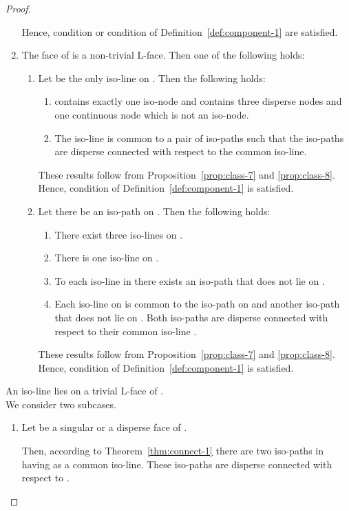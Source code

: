 \documentclass[a4paper,11pt]{article}
\begin{document}
\begin{proof}
\begin{enumerate}
Hence, condition  or condition  of Definition~\ref{def:component-1} are satisfied.
\item The face  of  is a non-trivial L-face. Then one of the following holds:
\begin{enumerate}
\item Let  be the only iso-line on . Then the following holds:
\begin{enumerate}
\item  contains exactly one iso-node and  contains three disperse nodes and one continuous node
which is not an iso-node.
\item The iso-line  is common to a pair of iso-paths such that the iso-paths are disperse
connected with respect to the common iso-line.
\end{enumerate}
These results follow from Proposition~\ref{prop:class-7} and \ref{prop:class-8}. Hence, condition  of
Definition~\ref{def:component-1} is satisfied.
\item Let there be an iso-path on . Then the following holds:
\begin{enumerate}
\item There exist three iso-lines on .
\item There is one iso-line on .
\item To each iso-line in  there exists an iso-path that does not lie on .
\item Each iso-line on  is common to the iso-path on  and another iso-path that does not lie on
. Both iso-paths are disperse connected with respect to their common iso-line .
\end{enumerate}
These results follow from Proposition~\ref{prop:class-7} and \ref{prop:class-8}. Hence, condition  of
Definition~\ref{def:component-1} is satisfied.
\end{enumerate}
\end{enumerate}
An iso-line  lies on a trivial L-face
 of . \\

We consider two subcases.
\begin{enumerate}
\item Let  be a singular or a disperse face of .

Then, according to Theorem~\ref{thm:connect-1} there are two iso-paths in  having  as a common
iso-line. These iso-paths are disperse connected with respect to .


\end{enumerate}
\end{proof}
\end{document}
